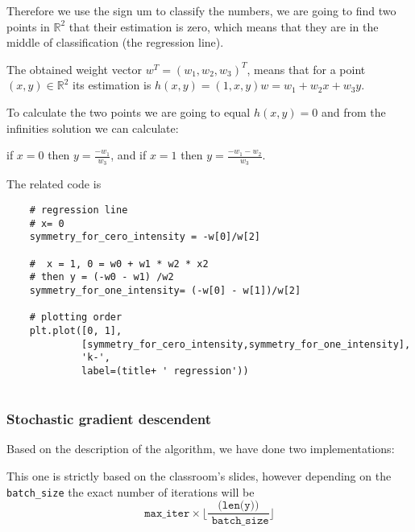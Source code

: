   Therefore we use the sign um to classify the numbers, we are going to find two points in $\mathbb R^2$ that their estimation is zero, which means that they are in the middle of classification (the regression line).

  The obtained weight vector $w^T = (w_1,w_2,w_3)^T$, means that for a point $(x,y) \in \mathbb R^2$
  its estimation is $h(x,y) = (1,x,y) w = w_1 + w_2x + w_3y$.

  To calculate the two points we are going to equal $h(x,y)=0$ and from the infinities solution we can calculate:

  if $x=0$ then $y = \frac{- w_1}{w_3}$, and if  $x=1$ then $y = \frac{- w_1 - w_2}{w_3}.$
  

  The related code is


  \begin{verbatim}
    # regression line
    # x= 0
    symmetry_for_cero_intensity = -w[0]/w[2]

    #  x = 1, 0 = w0 + w1 * w2 * x2
    # then y = (-w0 - w1) /w2
    symmetry_for_one_intensity= (-w[0] - w[1])/w[2]

    # plotting order
    plt.plot([0, 1],
             [symmetry_for_cero_intensity,symmetry_for_one_intensity],
             'k-',
             label=(title+ ' regression'))
     
  \end{verbatim}

  
  \subsubsection{Stochastic gradient descendent}

  Based on the description of the algorithm, we have done two implementations:

  This one is strictly based on the classroom's slides, however depending on the \texttt{batch\_size} the exact number of iterations will be
$$\texttt{max\_iter} \times \lfloor \frac{ \texttt{(len(y))}}{\texttt{ batch\_size}} \rfloor$$ 

